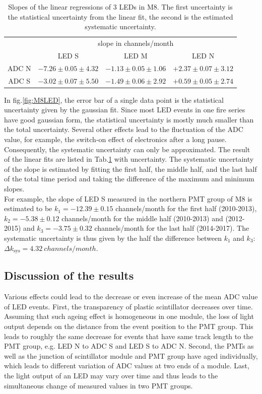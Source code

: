 \begin{table}[hb]
  \centering
  \caption{Slopes of the linear regressions of 3 LEDs in M8. The first uncertainty is the statistical uncertainty from the linear fit, the second is the estimated systematic uncertainty. }
  \label{tab:led}
  \begin{tabular}{c c c c}
  \toprule
        & \multicolumn{3}{c}{slope in channels/month} \\
        & LED S   & LED M  & LED N \\
  \midrule
  ADC N & $-7.26\pm0.05\pm4.32$ & $-1.13\pm0.05\pm1.06$ & $+2.37\pm0.07\pm3.12$  \\
  ADC S & $-3.02\pm0.07\pm5.50$ & $-1.49\pm0.06\pm2.92$ & $+0.59\pm0.05\pm2.74$  \\
  \bottomrule
  \end{tabular}

\end{table}

In fig.\ref{fig:M8LED}, the error bar of a single data point is the statistical uncertainty given by the gaussian fit. Since most LED events in one fire series have good gaussian form, the statistical uncertainty is mostly much smaller than the total uncertainty. Several other effects lead to the fluctuation of the ADC value, for example, the switch-on effect of electronics after a long pause. Consequently, the systematic uncertainty can only be approximated. The result of the linear fits are listed in Tab.\ref{tab:led} with uncertainty. The systematic uncertainty of the slope is estimated by fitting the first half, the middle half, and the last half of the total time period and taking the difference of the maximum and minimum slopes. \\
For example, the slope of LED S measured in the northern PMT group of M8 is estimated to be $k_{1}=-12.39\pm0.15$ channels/month for the first half (2010-2013), $k_{2}=-5.38\pm0.12$ channels/month for the middle half (2010-2013) and (2012-2015) and $k_{3}=-3.75\pm0.32$ channels/month for the last half (2014-2017). The systematic uncertainty is thus given by the half the difference between $k_{1}$ and $k_{3}$: $\Delta k_{\mathrm{sys}}=\SI{4.32}{channels/month}$.

\subsection{Discussion of the results}

Various effects could lead to the decrease or even increase of the mean ADC value of LED events. First, the transparency of plastic scintillator decreases over time. Assuming that such ageing effect is homogeneous in one module, the loss of light output depends on the distance from the event position to the PMT group. This leads to roughly the same decrease for events that have same track length to the PMT group, e.g. LED N to ADC S and LED S to ADC N. Second, the PMTs as well as the junction of scintillator module and PMT group have aged individually, which leads to different variation of ADC values at two ends of a module. Last, the light output of an LED may vary over time and thus leads to the simultaneous change of measured values in two PMT groups.

